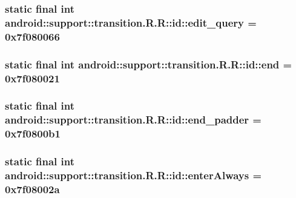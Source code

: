 \hypertarget{classandroid_1_1support_1_1transition_1_1_r_1_1id_0bbcffa2b2d0687e6b07a9d76e6056d6}{
\subsubsection[{edit\_\-query}]{\setlength{\rightskip}{0pt plus 5cm}static final int android::support::transition.R.R::id::edit\_\-query = 0x7f080066}}
\label{classandroid_1_1support_1_1transition_1_1_r_1_1id_0bbcffa2b2d0687e6b07a9d76e6056d6}


\hypertarget{classandroid_1_1support_1_1transition_1_1_r_1_1id_2f76a9a139b183319a8e377854921312}{
\subsubsection[{end}]{\setlength{\rightskip}{0pt plus 5cm}static final int android::support::transition.R.R::id::end = 0x7f080021}}
\label{classandroid_1_1support_1_1transition_1_1_r_1_1id_2f76a9a139b183319a8e377854921312}


\hypertarget{classandroid_1_1support_1_1transition_1_1_r_1_1id_fc505e53159c36902a147c7b5fa18938}{
\subsubsection[{end\_\-padder}]{\setlength{\rightskip}{0pt plus 5cm}static final int android::support::transition.R.R::id::end\_\-padder = 0x7f0800b1}}
\label{classandroid_1_1support_1_1transition_1_1_r_1_1id_fc505e53159c36902a147c7b5fa18938}


\hypertarget{classandroid_1_1support_1_1transition_1_1_r_1_1id_d8e315216e320f08b8707e33a63e282f}{
\subsubsection[{enterAlways}]{\setlength{\rightskip}{0pt plus 5cm}static final int android::support::transition.R.R::id::enterAlways = 0x7f08002a}}
\label{classandroid_1_1support_1_1transition_1_1_r_1_1id_d8e315216e320f08b8707e33a63e282f}


